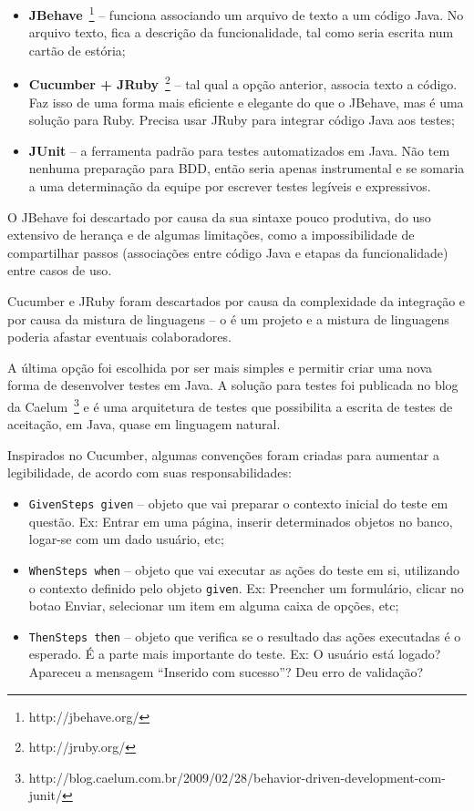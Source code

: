 \begin{itemize}
	\item{\textbf{JBehave}~\footnote{http://jbehave.org/} -- funciona associando um arquivo de texto a um código Java. No arquivo texto, fica a descrição da funcionalidade, tal como seria escrita num cartão de estória;}
	\item{\textbf{Cucumber + JRuby}~\footnote{http://jruby.org/} -- tal qual a opção anterior, associa texto a código. Faz isso de uma forma mais eficiente e elegante do que o JBehave, mas é uma solução para Ruby. Precisa usar JRuby para integrar código Java aos testes;}
	\item{\textbf{JUnit} -- a ferramenta padrão para testes automatizados em Java. Não tem nenhuma preparação para BDD, então seria apenas instrumental e se somaria a uma determinação da equipe por escrever testes legíveis e expressivos.}
\end{itemize}

O JBehave foi descartado por causa da sua sintaxe pouco produtiva, do uso extensivo de herança e de algumas limitações, como a impossibilidade de compartilhar passos (associações entre código Java e etapas da funcionalidade) entre casos de uso.

Cucumber e JRuby foram descartados por causa da complexidade da integração e por causa da mistura de linguagens -- o \calopsita{} é um projeto \opensource{} e a mistura de linguagens poderia afastar eventuais colaboradores.

A última opção foi escolhida por ser mais simples e permitir criar uma nova forma de desenvolver testes em Java. A solução para testes foi publicada no blog da Caelum~\footnote{http://blog.caelum.com.br/2009/02/28/behavior-driven-development-com-junit/} e é uma arquitetura de testes que possibilita a escrita de testes de aceitação, em Java, quase em linguagem natural. 

Inspirados no Cucumber, algumas convenções foram criadas para aumentar a legibilidade, de acordo com suas responsabilidades:

\begin{itemize}
	\item{\texttt{GivenSteps given} -- objeto que vai preparar o contexto inicial do teste em questão. Ex: Entrar em uma página, inserir determinados objetos no banco, logar-se com um dado usuário, etc;}
	\item{\texttt{WhenSteps when} -- objeto que vai executar as ações do teste em si, utilizando o contexto definido pelo objeto \texttt{given}. Ex: Preencher um formulário, clicar no botao Enviar, selecionar um item em alguma caixa de opções, etc;}
	\item{\texttt{ThenSteps then} -- objeto que verifica se o resultado das ações executadas é o esperado. É a parte mais importante do teste. Ex: O usuário está logado? Apareceu a mensagem ``Inserido com sucesso''? Deu erro de validação?}
\end{itemize}

